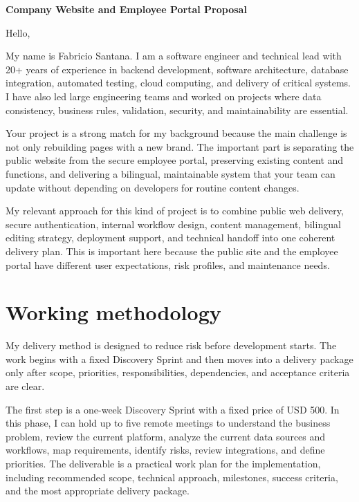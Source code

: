 \documentclass[11pt,a4paper]{article}
\begin{document}
\begin{center}
{\LARGE\bfseries Company Website and Employee Portal Proposal}
\end{center}
\vspace{0.5em}

Hello,\par

My name is Fabricio Santana. I am a software engineer and technical lead with 20+ years of experience in backend development, software architecture, database integration, automated testing, cloud computing, and delivery of critical systems. I have also led large engineering teams and worked on projects where data consistency, business rules, validation, security, and maintainability are essential.\par

Your project is a strong match for my background because the main challenge is not only rebuilding pages with a new brand. The important part is separating the public website from the secure employee portal, preserving existing content and functions, and delivering a bilingual, maintainable system that your team can update without depending on developers for routine content changes.\par

My relevant approach for this kind of project is to combine public web delivery, secure authentication, internal workflow design, content management, bilingual editing strategy, deployment support, and technical handoff into one coherent delivery plan. This is important here because the public site and the employee portal have different user expectations, risk profiles, and maintenance needs.\par

\section*{Working methodology}

My delivery method is designed to reduce risk before development starts. The work begins with a fixed Discovery Sprint and then moves into a delivery package only after scope, priorities, responsibilities, dependencies, and acceptance criteria are clear.\par

The first step is a one-week Discovery Sprint with a fixed price of USD 500. In this phase, I can hold up to five remote meetings to understand the business problem, review the current platform, analyze the current data sources and workflows, map requirements, identify risks, review integrations, and define priorities. The deliverable is a practical work plan for the implementation, including recommended scope, technical approach, milestones, success criteria, and the most appropriate delivery package.\par
\end{document}
